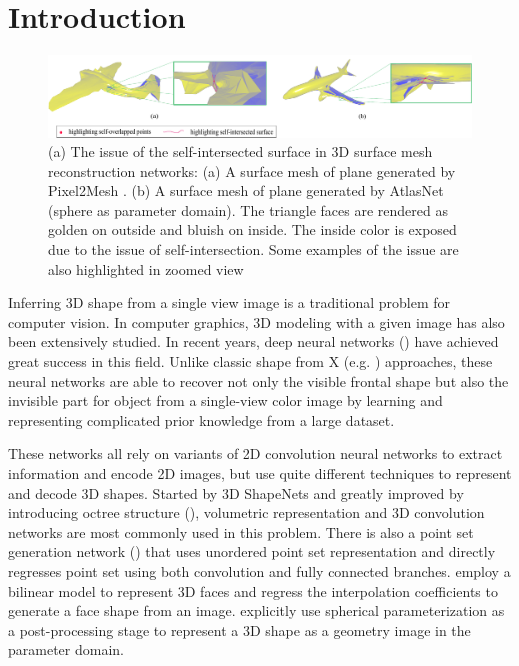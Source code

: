 \section{Introduction}
\begin{figure}[htbp]
	\centering
	\includegraphics[width=\linewidth]{img/issue/issue}
	\caption{(a) The issue of the self-intersected surface in 3D surface mesh reconstruction networks: (a) A surface mesh of plane generated by Pixel2Mesh \cite{pixel2mesh}. (b) A surface mesh of plane generated by AtlasNet \cite{atlasnet}(sphere as parameter domain). The triangle faces are rendered as golden on outside and bluish on inside. The inside color is exposed due to the issue of self-intersection. Some examples of the issue are also highlighted in zoomed view}
	\label{fig:issue}
\end{figure}
Inferring 3D shape from a single view image is a traditional problem for computer vision. In computer graphics, 3D modeling with a given image has also been extensively studied. In recent years, deep neural networks (\cite{3DR2N2,PSGN,3Drender,imgrecon15,3dshapenet,endface,octreegen,surfnet,shapeprior}) have achieved great success in this field. Unlike classic shape from X (e.g. \cite{shapefromshading,shapefromtext1,shapefromtext2}) approaches, these neural networks are able to recover not only the visible frontal shape but also the invisible part for object from a single-view color image by learning and representing complicated prior knowledge from a large dataset. 

These networks all rely on variants of 2D convolution neural networks to extract information and encode 2D images, but use quite different techniques to represent and decode 3D shapes. Started by 3D ShapeNets \cite{3dshapenet} and greatly improved by introducing octree structure (\cite{octreegen}), volumetric representation and 3D convolution networks are most commonly used in this problem. There is also a point set generation network (\cite{PSGN}) that uses unordered point set representation and directly regresses point set using both convolution and fully connected branches. \cite{endface} employ a bilinear model to represent 3D faces and regress the interpolation coefficients to generate a face shape from an image. \cite{surfnet} explicitly use spherical parameterization as a post-processing stage to represent a 3D shape as a geometry image in the parameter domain. 

